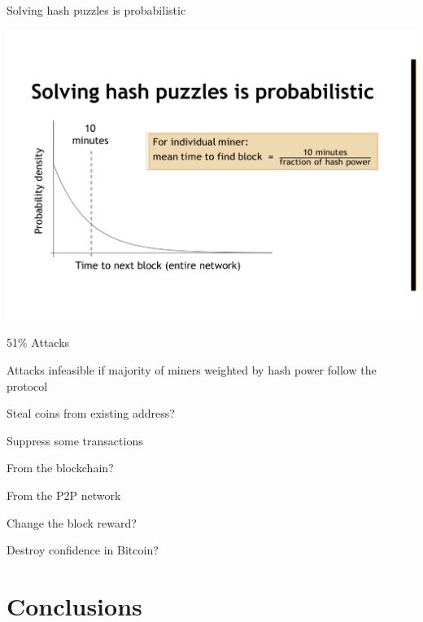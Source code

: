 \begin{frame}{Solving hash puzzles is probabilistic}
	
\includegraphics[width=\textwidth]{solving}

\end{frame}

\begin{frame}{51\% Attacks}
	
\BI
\item Attacks infeasible if majority of miners weighted by hash power follow the protocol
\EI

\BI
\item Steal coins from existing address? 
\item Suppress some transactions 
	\BI
	\item From the blockchain? \onslide<3-6|handout:1>{YES}
	\item From the P2P network \onslide<4-6|handout:1>{NO}
	\EI
\item Change the block reward? 
\item Destroy confidence in Bitcoin? 	
\EI 

\end{frame}

\section{Conclusions}

